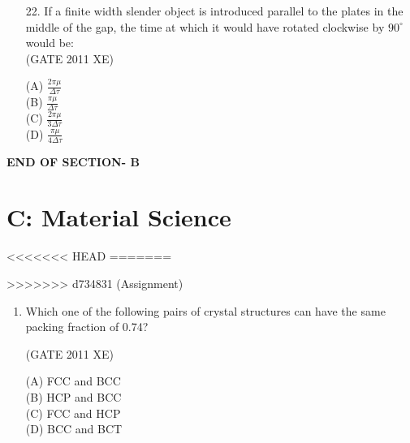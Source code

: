 \documentclass[journal,12pt,onecolumn]{IEEEtran}
\begin{document}
\begin{enumerate}
\begin{enumerate}
\begin{enumerate}
\hfill{(GATE 2011 XE)} \\
\begin{multicols}{4}
(A) $\frac{h\Delta\tau}{2\mu}$\\
(B) $\frac{h\Delta\tau}{\mu}$\\
(C) $\frac{2h\Delta\tau}{\mu}$\\
(D) $\frac{3h\Delta\tau}{2\mu}$
\end{multicols}

\item[22.] If a finite width slender object is introduced parallel to the plates in the middle of the gap, the time at which it would have rotated clockwise by $90^\circ$ would be:\\

\hfill{(GATE 2011 XE)} \\
\begin{multicols}{4}
(A) $\frac{2\pi\mu}{\Delta\tau}$\\
(B) $\frac{\pi\mu}{\Delta\tau}$\\
(C) $\frac{2\pi\mu}{3\Delta\tau}$\\
(D) $\frac{\pi\mu}{4\Delta\tau}$
\end{multicols}

\end{enumerate}

\vspace{1\baselineskip}
    \begin{center}
    \textbf{\Large END OF SECTION- B}
    \end{center}


\newpage
\section{C: Material Science}
<<<<<<< HEAD
\bigskip
=======

>>>>>>> d734831 (Assignment)
\begin{enumerate}

\item Which one of the following pairs of crystal structures can have the same packing fraction of 0.74?

\hfill{(GATE 2011 XE)}\\
\begin{multicols}{4}
(A) FCC and BCC \\
(B) HCP and BCC \\
(C) FCC and HCP \\
(D) BCC and BCT
\end{multicols}


\end{enumerate}
\end{enumerate}
\end{enumerate}
\end{document}
